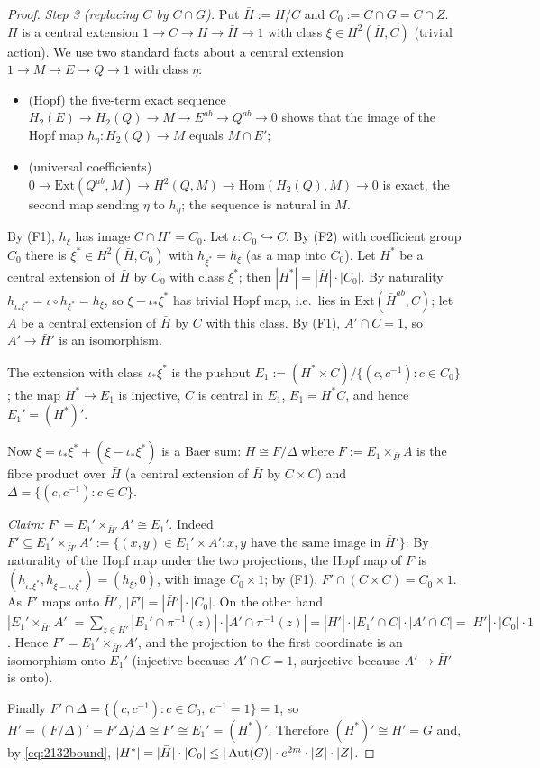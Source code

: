 \begin{proof}
\emph{Step 3 (replacing $C$ by $C\cap G$).} Put $\bar H:=H/C$ and $C_0:=C\cap G=C\cap Z$. $H$ is a central extension
$1\to C\to H\to\bar H\to 1$ with class $\xi\in H^2(\bar H,C)$ (trivial action). We use two standard facts about a
central extension $1\to M\to E\to Q\to 1$ with class $\eta$:
\begin{itemize}
\item[(F1)] (Hopf) the five-term exact sequence $H_2(E)\to H_2(Q)\to M\to E^{ab}\to Q^{ab}\to 0$ shows that the
image of the Hopf map $h_\eta:H_2(Q)\to M$ equals $M\cap E'$;
\item[(F2)] (universal coefficients) $0\to\mathrm{Ext}(Q^{ab},M)\to H^2(Q,M)\to\mathrm{Hom}(H_2(Q),M)\to 0$ is
exact, the second map sending $\eta$ to $h_\eta$; the sequence is natural in $M$.
\end{itemize}
By (F1), $h_\xi$ has image $C\cap H'=C_0$. Let $\iota:C_0\hookrightarrow C$. By (F2) with coefficient group
$C_0$ there is $\xi^*\in H^2(\bar H,C_0)$ with $h_{\xi^*}=h_\xi$ (as a map into $C_0$). Let $H^*$ be a central
extension of $\bar H$ by $C_0$ with class $\xi^*$; then $|H^*|=|\bar H|\cdot|C_0|$. By naturality
$h_{\iota_*\xi^*}=\iota\circ h_{\xi^*}=h_\xi$, so $\xi-\iota_*\xi^*$ has trivial Hopf map, i.e.\ lies in
$\mathrm{Ext}(\bar H^{ab},C)$; let $A$ be a central extension of $\bar H$ by $C$ with this class. By (F1),
$A'\cap C=1$, so $A'\to\bar H'$ is an isomorphism.

The extension with class $\iota_*\xi^*$ is the pushout $E_1:=(H^*\times C)/\{(c,c^{-1}):c\in C_0\}$; the map
$H^*\to E_1$ is injective, $C$ is central in $E_1$, $E_1=H^*C$, and hence $E_1'=(H^*)'$.

Now $\xi=\iota_*\xi^*+(\xi-\iota_*\xi^*)$ is a Baer sum: $H\cong F/\Delta$ where $F:=E_1\times_{\bar H}A$ is the fibre
product over $\bar H$ (a central extension of $\bar H$ by $C\times C$) and $\Delta=\{(c,c^{-1}):c\in C\}$.

\emph{Claim:} $F'=E_1'\times_{\bar H'}A'\cong E_1'$. Indeed $F'\subseteq E_1'\times_{\bar H'}A':=\{(x,y)\in E_1'\times
A':x,y\text{ have the same image in }\bar H'\}$. By naturality of the Hopf map under the two projections, the Hopf
map of $F$ is $(h_{\iota_*\xi^*},h_{\xi-\iota_*\xi^*})=(h_\xi,0)$, with image $C_0\times 1$; by (F1),
$F'\cap(C\times C)=C_0\times 1$. As $F'$ maps onto $\bar H'$, $|F'|=|\bar H'|\cdot|C_0|$. On the other hand
$|E_1'\times_{\bar H'}A'|=\sum_{z\in\bar H'}|E_1'\cap\pi^{-1}(z)|\cdot|A'\cap\pi^{-1}(z)|=|\bar H'|\cdot|E_1'\cap C|
\cdot|A'\cap C|=|\bar H'|\cdot|C_0|\cdot 1$. Hence $F'=E_1'\times_{\bar H'}A'$, and the projection to the first
coordinate is an isomorphism onto $E_1'$ (injective because $A'\cap C=1$, surjective because $A'\to\bar H'$ is
onto).

Finally $F'\cap\Delta=\{(c,c^{-1}):c\in C_0,\ c^{-1}=1\}=1$, so $H'=(F/\Delta)'=F'\Delta/\Delta\cong F'\cong E_1'=
(H^*)'$. Therefore $(H^*)'\cong H'=G$ and, by \eqref{eq:2132bound},
$|H^*|=|\bar H|\cdot|C_0|\le|\operatorname{Aut}(G)|\cdot e^{2m}\cdot|Z|\cdot|Z|$.
\end{proof}

